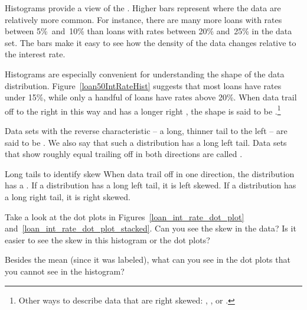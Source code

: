 Histograms provide a view of the .
Higher bars represent where the data are relatively more common.
For instance, there are many more loans with rates between
5\%~and~10\% than loans with rates between 20\% and~25\%
in the data set.
The bars make it easy to see how the density of the data
changes relative to the interest rate.

Histograms are especially convenient for understanding the
shape of the data distribution\label{shapeFirstDiscussed}.
Figure~\ref{loan50IntRateHist} suggests that most loans
have rates under 15\%, while only a handful
of loans have rates above 20\%.
When data trail off to the right in this way
and has a longer right ,
the shape is said to be
.\footnote{Other
  ways to describe data that are right skewed:
  ,
  ,
  or .}

Data sets with the reverse characteristic --
a long, thinner tail to the left --
are said to be .
We also say that such a distribution has a long left tail.
Data sets that show roughly equal trailing off in both
directions are called .

\begin{onebox}{Long tails to identify skew}
  When data trail off in one direction, the distribution
  has a . 
  If a distribution has a long left tail, it is left skewed.
  If a distribution has a long right tail, it is right skewed.
\end{onebox}

\D{\newpage}

\begin{exercisewrap}
\begin{nexercise}
Take a look at the dot plots in
Figures~\ref{loan_int_rate_dot_plot}
and~\ref{loan_int_rate_dot_plot_stacked}.
Can you see the skew in the data? Is it easier to see the
skew in this histogram or the dot plots?\footnotemark{}
\end{nexercise}
\end{exercisewrap}

\begin{exercisewrap}
\begin{nexercise}
Besides the mean (since it was labeled), what can you see
in the dot plots that you cannot see in the
histogram?\footnotemark{}
\end{nexercise}
\end{exercisewrap}

